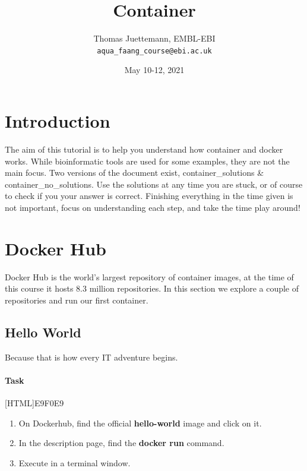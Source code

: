 \documentclass[12pt]{article}
\begin{document}
	
	\title{Container} 
	\author{Thomas Juettemann, EMBL-EBI\\
	\texttt{aqua\_faang\_course@ebi.ac.uk}}  %
	\date{May 10-12, 2021}  %
	\maketitle
	

	\section{Introduction}
		The aim of this tutorial is to help you understand how container and docker works.
		While bioinformatic tools are used for some examples, they are not the main focus.
		Two versions of the document exist, container\_solutions \& container\_no\_solutions.
		Use the solutions at any time you are stuck, or of course to check if you your answer is correct.
		Finishing everything in the time given is not important, focus on understanding each step,  and take the time play around! 
		
	
	
	\section{Docker Hub}
		Docker Hub is the world’s largest repository of container images, at the time of this course it hosts 8.3 million repositories. 
		In this section we explore a couple of repositories and run our first container.
	
		\subsection{Hello World}
			Because that is how every IT adventure begins.
			
			
			\paragraph{Task}
				[HTML]{E9F0E9}{\parbox{\linewidth}{%
						\begin{enumerate}
							\item On Dockerhub, find the official  \textbf{hello-world} image and click on it.
							\item In the description page, find the \textbf{docker run } command.
							\item Execute  in a terminal window.
						\end{enumerate}
				}}
			
\end{document}
